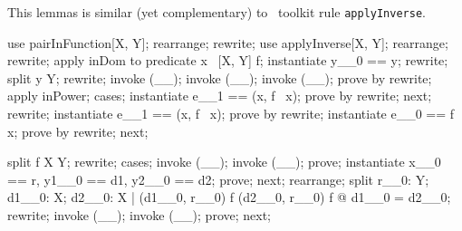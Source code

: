 This lemmas is similar (yet complementary) to \zeves\ toolkit rule \texttt{applyInverse}.






\begin{LPScript}\begin{forget}[lPairInvInPInj]
use pairInFunction[X, Y];
rearrange;
rewrite;
use applyInverse[X, Y];
rearrange;
rewrite;
apply inDom to predicate x \in  \dom~[X, Y] f;
instantiate y\_\_0 == y;
rewrite;
split y \in  Y;
rewrite;
invoke (\_\pinj \_);
invoke (\_\pfun \_);
invoke (\_\rel \_);
prove by rewrite;
apply inPower;
cases;
instantiate e\_\_1 == (x, f~ x);
prove by rewrite;
next;
rewrite;
instantiate e\_\_1 == (x, f~ x);
prove by rewrite;
instantiate e\_\_0 == f~ x;
prove by rewrite;
next;
\end{forget}\end{LPScript}

\begin{LPScript}\begin{forget}[lPInjWeakening]
split f \in  X \pinj  Y;
rewrite;
cases;
invoke (\_\pinj \_);
invoke (\_\pfun \_);
prove;
instantiate x\_\_0 == r, y1\_\_0 == d1, y2\_\_0 == d2;
prove;
next;
rearrange;
split \forall  r\_\_0: Y; d1\_\_0: X; d2\_\_0: X | (d1\_\_0, r\_\_0) \in  f
    \land  (d2\_\_0, r\_\_0) \in  f @ d1\_\_0 = d2\_\_0;
rewrite;
invoke (\_\pinj \_);
invoke (\_\pfun \_);
prove;
next;
\end{forget}\end{LPScript}

